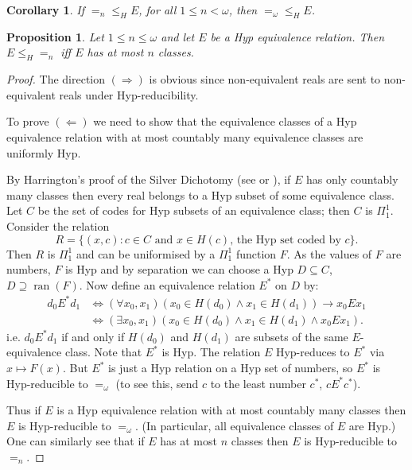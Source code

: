 \documentclass[11pt, english]{article}
\newtheorem{prop}{Proposition}
\newtheorem{cor}{Corollary}
\DeclareMathOperator{\ran}{ran}
\begin{document}
\begin{cor}
If $=_n\leq_H E$, for all $1\leq n<\omega$, then $=_{\omega}\leq_H E$.
\end{cor}


\begin{prop}\label{prop2}
Let $1\leq n\leq\omega$ and let $E$ be a Hyp equivalence relation. Then
$E\leq_H =_n$ iff $E$ has at most $n$ classes.
\end{prop}

\begin{proof}
The direction $(\Rightarrow)$ is obvious since non-equivalent reals
are sent to non-equivalent reals under Hyp-reducibility.

To prove $(\Leftarrow)$ we need to show that the equivalence classes
of a Hyp equivalence relation with at most countably many
equivalence classes are uniformly Hyp.


By Harrington's proof of the Silver Dichotomy (see \cite[Theorem
32.1]{jech03} or \cite[Theorem 5.3.5]{gao09}), if $E$ has only countably many classes then every real belongs
to a Hyp subset of some equivalence class. Let $C$ be the set of
codes for Hyp subsets of an equivalence class; then $C$ is
$\Pi^1_1$. Consider the relation
$$
R = \{(x,c) : c\in C \text{ and } x\in H(c)\text{, the Hyp set coded
by }c\}.
$$
Then $R$ is $\Pi^1_1$ and can be uniformised by a $\Pi^1_1$ function
$F$. As the values of $F$ are numbers, $F$ is Hyp and by separation
we can choose a Hyp $D\subseteq C$, $D\supseteq \ran(F)$. Now define
an equivalence relation $E^*$ on $D$ by:
\begin{align*}
 d_0 E^* d_1 & \iff (\forall x_0,x_1) (x_0\in H(d_0)\wedge x_1\in H(d_1))\rightarrow x_0Ex_1\\
 & \iff (\exists x_0,x_1) (x_0\in H(d_0)\wedge x_1\in H(d_1)\wedge x_0Ex_1).
\end{align*}
i.e. $d_0 E^* d_1$ if and only if $H(d_0)$  and $H(d_1)$ are
subsets of the same $E$-equivalence class. Note that $E^*$ is Hyp.
The relation $E$ Hyp-reduces to $E^*$ via $x\mapsto F(x)$. But $E^*$
is just a Hyp relation on a Hyp set of numbers, so $E^*$ is
Hyp-reducible to $=_{\omega}$ (to see this, send $c$ to the least
number $c^*$, $cE^*c^*$).

Thus if $E$ is a Hyp equivalence relation with at most countably
many classes then $E$ is Hyp-reducible to $=_{\omega}$. (In
particular, all equivalence classes of $E$ are Hyp.) One can
similarly see that if $E$ has at most $n$ classes then $E$ is
Hyp-reducible to $=_n$.
\end{proof}
\end{document}
